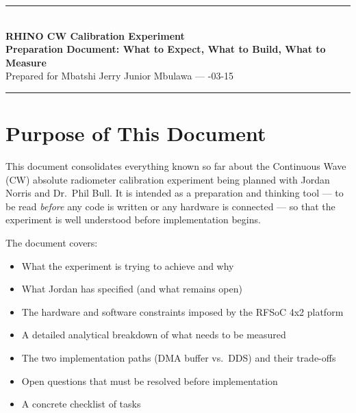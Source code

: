 \documentclass[11pt,a4paper]{article}
\begin{document}

\begin{center}
{\color{xilinxblue}\rule{\linewidth}{2pt}}\\[6pt]
{\LARGE\bfseries\color{xilinxblue}RHINO CW Calibration Experiment}\\[4pt]
{\large\bfseries Preparation Document: What to Expect, What to Build, What to Measure}\\[4pt]
{\normalsize Prepared for Mbatshi Jerry Junior Mbulawa \quad --- -03-15}\\[6pt]
{\color{xilinxblue}\rule{\linewidth}{2pt}}
\end{center}

\tableofcontents
\newpage

\section{Purpose of This Document}

This document consolidates everything known so far about the Continuous Wave (CW)
absolute radiometer calibration experiment being planned with Jordan Norris and
Dr.\ Phil Bull. It is intended as a preparation and thinking tool --- to be read
\textit{before} any code is written or any hardware is connected --- so that the
experiment is well understood before implementation begins.

The document covers:
\begin{itemize}[leftmargin=2em,itemsep=3pt]
  \item What the experiment is trying to achieve and why
  \item What Jordan has specified (and what remains open)
  \item The hardware and software constraints imposed by the RFSoC 4x2 platform
  \item A detailed analytical breakdown of what needs to be measured
  \item The two implementation paths (DMA buffer vs.\ DDS) and their trade-offs
  \item Open questions that must be resolved before implementation
  \item A concrete checklist of tasks
\end{itemize}

\end{document}
